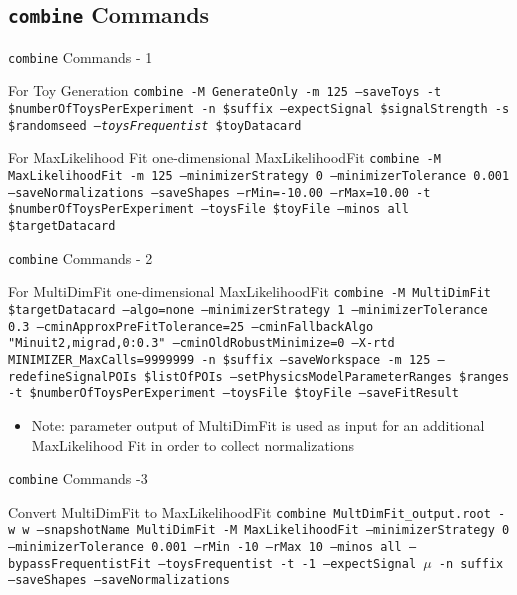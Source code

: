 \subsection{\texttt{combine} Commands}

\begin{frame}{\texttt{combine} Commands - 1}
\begin{block}{For Toy Generation}
\texttt{combine -M GenerateOnly -m 125 --saveToys -t \$numberOfToysPerExperiment -n \$suffix --expectSignal \$signalStrength -s \$randomseed \emph{--toysFrequentist} \$toyDatacard}
\end{block}
\begin{block}{For MaxLikelihood Fit}
\hypertarget{1DML}{one-dimensional MaxLikelihoodFit}
\texttt{combine -M MaxLikelihoodFit -m 125 --minimizerStrategy 0 --minimizerTolerance 0.001 --saveNormalizations --saveShapes --rMin=-10.00 --rMax=10.00 -t \$numberOfToysPerExperiment --toysFile \$toyFile --minos all \$targetDatacard}
\end{block}

\end{frame}

\begin{frame}{\texttt{combine} Commands - 2}
\begin{block}{For MultiDimFit}
\hypertarget{MDF}{one-dimensional MaxLikelihoodFit}
\texttt{combine -M MultiDimFit \$targetDatacard --algo=none --minimizerStrategy 1 --minimizerTolerance 0.3 --cminApproxPreFitTolerance=25 --cminFallbackAlgo "Minuit2,migrad,0:0.3" --cminOldRobustMinimize=0 --X-rtd MINIMIZER\_MaxCalls=9999999 -n \$suffix --saveWorkspace -m 125 --redefineSignalPOIs \$listOfPOIs --setPhysicsModelParameterRanges \$ranges -t \$numberOfToysPerExperiment --toysFile \$toyFile --saveFitResult}
\end{block}
\begin{itemize}
\item Note: parameter output of MultiDimFit is used as input for an additional MaxLikelihood Fit in order to collect normalizations
\end{itemize}
\end{frame}

\begin{frame}{\texttt{combine} Commands -3}
\begin{block}{Convert MultiDimFit to MaxLikelihoodFit}
\texttt{combine MultDimFit\_output.root -w w --snapshotName MultiDimFit -M MaxLikelihoodFit --minimizerStrategy 0 --minimizerTolerance 0.001 --rMin -10 --rMax 10 --minos all --bypassFrequentistFit --toysFrequentist -t -1 --expectSignal $\mu$ -n suffix --saveShapes --saveNormalizations}
\end{block}
\end{frame}

